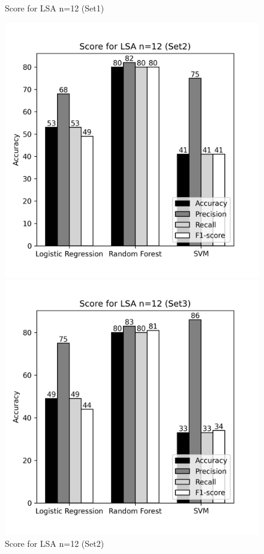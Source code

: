 \documentclass[12pt]{report}
\begin{document}
\begin{figure}[!htb]
\begin{minipage}{0.48\textwidth}
                  \caption{Score for LSA n=12 (Set1)}\label{Fig:typo2}
                \end{minipage}
             \end{figure}

             \begin{figure}[!htb]
                \begin{minipage}{0.48\textwidth}
                  \centering
                  \includegraphics[scale=0.55]{plots/Score for LSA n=12 (Set2).png}
                  \caption{Score for LSA n=12 (Set2)}\label{Fig:typo1}
                \end{minipage}\hfill
                \begin{minipage}{0.48\textwidth}
                  \centering
                  \includegraphics[scale=0.55]{plots/Score for LSA n=12 (Set3).png}

\end{minipage}
\end{figure}
\end{document}
